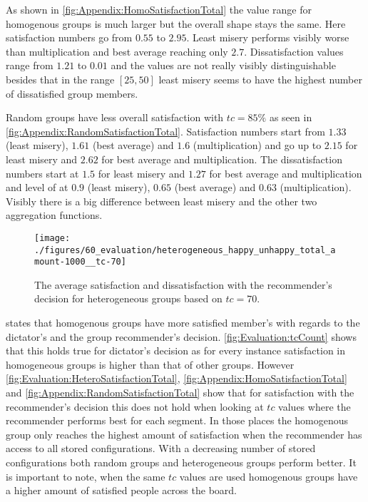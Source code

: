 As shown in \autoref{fig:Appendix:HomoSatisfactionTotal} the value range for homogenous groups is much larger but the overall shape stays the same. Here satisfaction numbers go from $0.55$ to $2.95$. Least misery performs visibly worse than multiplication and best average reaching only $2.7$. Dissatisfaction values range from $1.21$ to $0.01$ and the values are not really visibly distinguishable besides that in the range $[25,50]$ least misery seems to have the highest number of dissatisfied group members.

Random groups have less overall satisfaction with $tc = 85\%$ as seen in \autoref{fig:Appendix:RandomSatisfactionTotal}. Satisfaction numbers start from $1.33$ (least misery), $1.61$ (best average) and $1.6$ (multiplication) and go up to $2.15$ for least misery and $2.62$ for best average and multiplication. The dissatisfaction numbers start at $1.5$ for least misery and $1.27$ for best average and multiplication and level of at $0.9$ (least misery), $0.65$ (best average) and $0.63$ (multiplication). Visibly there is a big difference between least misery and the other two aggregation functions.

\begin{figure}
    \centering
    \texttt{[image: ./figures/60\_evaluation/heterogeneous\_happy\_unhappy\_total\_amount-1000\_\_tc-70]}
    \caption{The average satisfaction and dissatisfaction with the recommender's decision for heterogeneous groups based on $tc = 70$.}
    \label{fig:Evaluation:HeteroSatisfactionTotal}
\end{figure}

 states that homogenous groups have more satisfied member's with regards to the dictator's and the group recommender's decision. \autoref{fig:Evaluation:tcCount} shows that this holds true for dictator's decision as for every instance satisfaction in homogeneous groups is higher than that of other groups. However \autoref{fig:Evaluation:HeteroSatisfactionTotal}, \autoref{fig:Appendix:HomoSatisfactionTotal} and \autoref{fig:Appendix:RandomSatisfactionTotal} show that for satisfaction with the recommender's decision this does not hold when looking at $tc$ values where the recommender performs best for each  segment. In those places the homogenous group only reaches the highest amount of satisfaction when the recommender has access to all stored configurations. With a decreasing number of stored configurations both random groups and heterogeneous groups perform better. It is important to note, when the same $tc$ values are used homogenous groups have a higher amount of satisfied people across the board.

